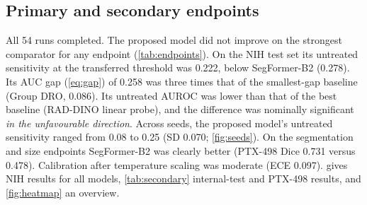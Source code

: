 \documentclass[final,3p]{elsarticle}
\begin{document}
\subsection{Primary and secondary endpoints}
\label{sec:res-endpoints}
All 54 runs completed. The proposed model did not improve on the strongest comparator for any endpoint (\cref{tab:endpoints}). On the NIH test set its untreated sensitivity at the transferred threshold was 0.222, below SegFormer-B2 (0.278). Its AUC gap (\cref{eq:gap}) of 0.258 was three times that of the smallest-gap baseline (Group DRO, 0.086). Its untreated AUROC was lower than that of the best baseline (RAD-DINO linear probe), and the difference was nominally significant \emph{in the unfavourable direction}. Across seeds, the proposed model's untreated sensitivity ranged from 0.08 to 0.25 (SD 0.070; \cref{fig:seeds}). On the segmentation and size endpoints SegFormer-B2 was clearly better (PTX-498 Dice 0.731 versus 0.478). Calibration after temperature scaling was moderate (ECE 0.097).  gives NIH results for all models, \cref{tab:secondary} internal-test and PTX-498 results, and \cref{fig:heatmap} an overview.
\end{document}
